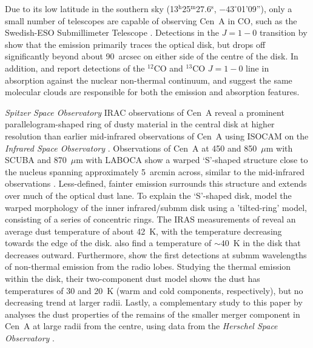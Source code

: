 \documentclass[useAMS,usenatbib,usegraphicx]{mn2e}
\begin{document}
Due to its low latitude in the southern sky (13$^{\mathrm{h}}$25$^{\mathrm{m}}$27.6$^{\mathrm{s}}$, $-43^{\circ}$01'09''), only a small number of telescopes are capable of observing Cen~A in CO, such as the Swedish-ESO Submillimeter Telescope \citep[SEST; e.g.][]{1987ApJ...322L..73P,1990ApJ...363..451E,1992ApJ...391..121Q,1993A&A...270L..13R}.  Detections in the $J=1-0$ transition by \citet{1990ApJ...363..451E} show that the emission primarily traces the optical disk, but drops off significantly beyond about 90~arcsec on either side of the centre of the disk. In addition, \citet{1990ApJ...363..451E} and \citet{1990ApJ...365..522E} report detections of the $^{12}$CO and $^{13}$CO $J=1-0$ line in absorption against the nuclear non-thermal continuum, and suggest the same molecular clouds are responsible for both the emission and absorption features.

\emph{Spitzer Space Observatory} IRAC observations of Cen~A \citep[][]{2006ApJ...645.1092Q} reveal a prominent parallelogram-shaped ring of dusty material in the central disk at higher resolution than earlier mid-infrared observations of Cen~A using ISOCAM on the \emph{Infrared Space Observatory} \citep[ISO; ][]{1999A&A...341..667M}.  Observations of Cen~A at 450 and 850~$\mu$m with SCUBA and 870~$\mu$m with LABOCA show a warped `S'-shaped structure close to the nucleus spanning approximately 5~arcmin across, similar to the mid-infrared observations \citep{2002ApJ...565..131L,2008A&A...490...77W}.  Less-defined, fainter emission surrounds this structure and extends over much of the optical dust lane.  To explain the `S'-shaped disk, \citet{2006ApJ...645.1092Q} model the warped morphology of the inner infrared/submm disk using a 'tilted-ring' model, consisting of a series of concentric rings.  The IRAS measurements of \citet{1990ApJ...363..451E} reveal an average dust temperature of about 42~K, with the temperature decreasing towards the edge of the disk.  \citet{2002ApJ...565..131L} also find a temperature of $\sim 40$~K in the disk that decreases outward.  Furthermore, \citet{2008A&A...490...77W} show the first detections at submm wavelengths of non-thermal emission from the radio lobes.  Studying the thermal emission within the disk, their two-component dust model shows the dust has temperatures of 30 and 20~K (warm and cold components, respectively), but no decreasing trend at larger radii.  Lastly, a complementary study to this paper by \citet{Auld_2011_submit} analyses the dust properties of the remains of the smaller merger component in Cen~A at large radii from the centre, using data from the \emph{Herschel Space Observatory} \citep{2010A&A...518L...1P}.
\end{document}
